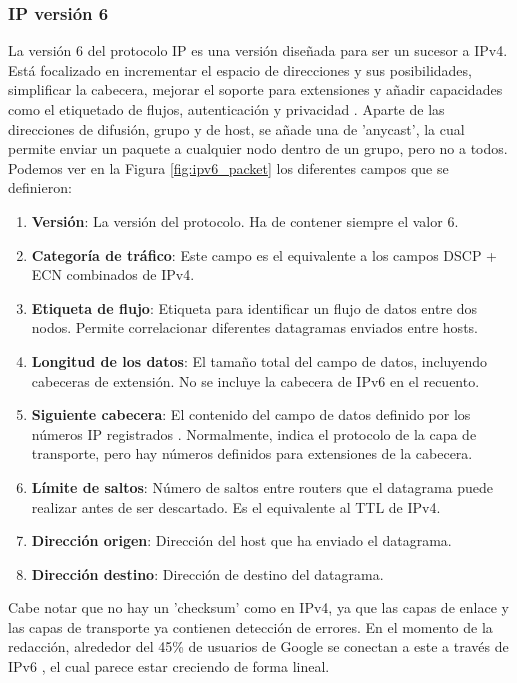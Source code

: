 \subsubsection{IP versión 6} \label{ipv6format}

La versión 6 del protocolo IP es una versión diseñada para ser un sucesor a IPv4. Está focalizado en incrementar el espacio de direcciones y sus posibilidades, simplificar la cabecera, mejorar el soporte para extensiones y añadir capacidades como el etiquetado de flujos, autenticación y privacidad \cite{rfc8200}. Aparte de las direcciones de difusión, grupo y de host, se añade una de 'anycast', la cual permite enviar un paquete a cualquier nodo dentro de un grupo, pero no a todos. Podemos ver en la Figura \ref{fig:ipv6_packet} los diferentes campos que se definieron:

\begin{enumerate}
    \item \textbf{Versión}: La versión del protocolo. Ha de contener siempre el valor 6.
    \item \textbf{Categoría de tráfico}: Este campo es el equivalente a los campos DSCP + ECN combinados de IPv4.
    \item \textbf{Etiqueta de flujo}: Etiqueta para identificar un flujo de datos entre dos nodos. Permite correlacionar diferentes datagramas enviados entre hosts.
    \item \textbf{Longitud de los datos}: El tamaño total del campo de datos, incluyendo cabeceras de extensión. No se incluye la cabecera de IPv6 en el recuento.
    \item \textbf{Siguiente cabecera}: El contenido del campo de datos definido por los números IP registrados \cite{ipprotocolnumbers}. Normalmente, indica el protocolo de la capa de transporte, pero hay números definidos para extensiones de la cabecera.
    \item \textbf{Límite de saltos}: Número de saltos entre routers que el datagrama puede realizar antes de ser descartado. Es el equivalente al TTL de IPv4.
    \item \textbf{Dirección origen}: Dirección del host que ha enviado el datagrama.
    \item \textbf{Dirección destino}: Dirección de destino del datagrama.
\end{enumerate}

Cabe notar que no hay un 'checksum' como en IPv4, ya que las capas de enlace y las capas de transporte ya contienen detección de errores. En el momento de la redacción, alrededor del 45\% de usuarios de Google se conectan a este a través de IPv6 \cite{ipv4ipv6usage}, el cual parece estar creciendo de forma lineal.

